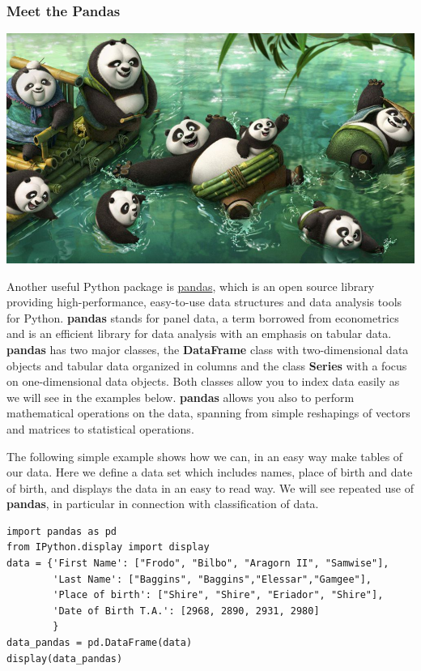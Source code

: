\documentclass{beamer}
\begin{document}
\begin{frame}
\frametitle{Meet the Pandas}

\vspace{6mm}

\centerline{\includegraphics[width=0.8\linewidth]{fig/pandas.jpg}}

\vspace{6mm}

Another useful Python package is
\href{{https://pandas.pydata.org/}}{pandas}, which is an open source library
providing high-performance, easy-to-use data structures and data
analysis tools for Python. \textbf{pandas} stands for panel data, a term borrowed from econometrics and is an efficient library for data analysis with an emphasis on tabular data.
\textbf{pandas} has two major classes, the \textbf{DataFrame} class with two-dimensional data objects and tabular data organized in columns and the class \textbf{Series} with a focus on one-dimensional data objects. Both classes allow you to index data easily as we will see in the examples below. 
\textbf{pandas} allows you also to perform mathematical operations on the data, spanning from simple reshapings of vectors and matrices to statistical operations. 

The following simple example shows how we can, in an easy way make tables of our data. Here we define a data set which includes names, place of birth and date of birth, and displays the data in an easy to read way. We will see repeated use of \textbf{pandas}, in particular in connection with classification of data. 











\begin{verbatim}
import pandas as pd
from IPython.display import display
data = {'First Name': ["Frodo", "Bilbo", "Aragorn II", "Samwise"],
        'Last Name': ["Baggins", "Baggins","Elessar","Gamgee"],
        'Place of birth': ["Shire", "Shire", "Eriador", "Shire"],
        'Date of Birth T.A.': [2968, 2890, 2931, 2980]
        }
data_pandas = pd.DataFrame(data)
display(data_pandas)


\end{verbatim}
\end{frame}
\end{document}
